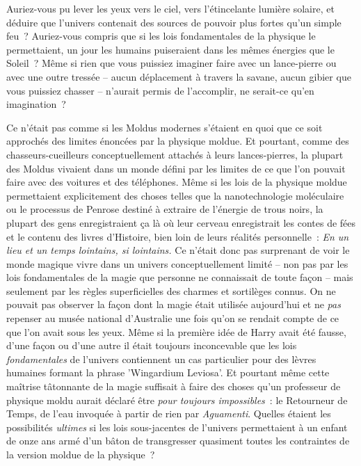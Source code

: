Auriez-vous pu lever les yeux vers le ciel, vers l'étincelante lumière solaire, et déduire que l'univers contenait des sources de pouvoir plus fortes qu'un simple feu~? Auriez-vous compris que si les lois fondamentales de la physique le permettaient, un jour les humains puiseraient dans les mêmes énergies que le Soleil~? Même si rien que vous puissiez imaginer faire avec un lance-pierre ou avec une outre tressée -- aucun déplacement à travers la savane, aucun gibier que vous puissiez chasser -- n'aurait permis de l'accomplir, ne serait-ce qu'en imagination~?

Ce n'était pas comme si les Moldus modernes s'étaient en quoi que ce soit approchés des limites énoncées par la physique moldue. Et pourtant, comme des chasseurs-cueilleurs conceptuellement attachés à leurs lances-pierres, la plupart des Moldus vivaient dans un monde défini par les limites de ce que l'on pouvait faire avec des voitures et des téléphones. Même si les lois de la physique moldue permettaient explicitement des choses telles que la nanotechnologie moléculaire ou le processus de Penrose destiné à extraire de l'énergie de trous noirs, la plupart des gens enregistraient ça là où leur cerveau enregistrait les contes de fées et le contenu des livres d'Histoire, bien loin de leurs réalités personnelle~: \emph{En un lieu et un temps lointains, si lointains.} Ce n'était donc pas surprenant de voir le monde magique vivre dans un univers conceptuellement limité -- non pas par les lois fondamentales de la magie que personne ne connaissait de toute façon -- mais seulement par les règles superficielles des charmes et sortilèges connus. On ne pouvait pas observer la façon dont la magie était utilisée aujourd'hui et ne \emph{pas} repenser au musée national d'Australie une fois qu'on se rendait compte de ce que l'on avait sous les yeux. Même si la première idée de Harry avait été fausse, d'une façon ou d'une autre il était toujours inconcevable que les lois \emph{fondamentales} de l'univers contiennent un cas particulier pour des lèvres humaines formant la phrase 'Wingardium Leviosa'. Et pourtant même cette maîtrise tâtonnante de la magie suffisait à faire des choses qu'un professeur de physique moldu aurait déclaré être \emph{pour toujours impossibles}~: le Retourneur de Temps, de l'eau invoquée à partir de rien par \emph{Aguamenti}. Quelles étaient les possibilités \emph{ultimes} si les lois sous-jacentes de l'univers permettaient à un enfant de onze ans armé d'un bâton de transgresser quasiment toutes les contraintes de la version moldue de la physique~?

